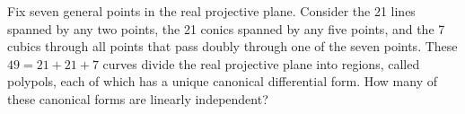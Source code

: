 Fix seven general points in the real projective plane. Consider the
21 lines spanned by any two points, the 21 conics spanned by any five
points, and the 7 cubics through all points that pass doubly through
one of the seven points. These $49 = 21+21+7$ curves divide the real
projective plane into regions, called polypols, each of which has a unique canonical differential form. How many of these canonical
forms are linearly independent?
